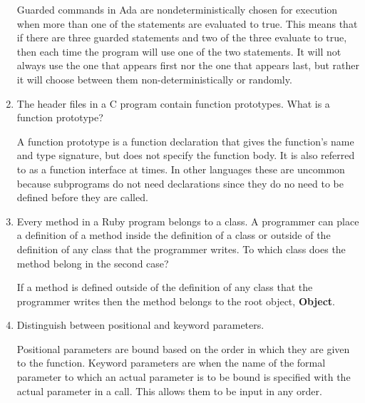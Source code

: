 \begin{enumerate}
\begin{answer}
    Guarded commands in Ada are nondeterministically chosen for
    execution when more than one of the statements are evaluated to
    true. This means that if there are three guarded statements and
    two of the three evaluate to true, then each time the program will
    use one of the two statements. It will not always use the one that
    appears first nor the one that appears last, but rather it will
    choose between them non-deterministically or randomly.
    
\end{answer}


  \item The header files in a C program contain function
    prototypes. What is a function prototype?

\begin{answer}

    A function prototype is a function declaration that gives the
    function's name and type signature, but does not specify the
    function body. It is also referred to as a function interface at
    times. In other languages these are uncommon because subprograms
    do not need declarations since they do no need to be defined
    before they are called.
    
\end{answer}


  \item Every method in a Ruby program belongs to a class.
    A programmer can place a definition of a method inside
    the definition of a class or outside of the definition
    of any class that the programmer writes. To which class
    does the method belong in the second case?
 
 \begin{answer}
 
    If a method is defined outside of the definition of any class that
    the programmer writes then the method belongs to the root object,
    \textbf{Object}.
    
\end{answer}

  \item Distinguish between positional and keyword parameters.
  
\begin{answer}

  Positional parameters are bound based on the order in which they are
  given to the function. Keyword parameters are when the name of the
  formal parameter to which an actual parameter is to be bound is
  specified with the actual parameter in a call. This allows them to
  be input in any order.
  

\end{answer}
\end{enumerate}
